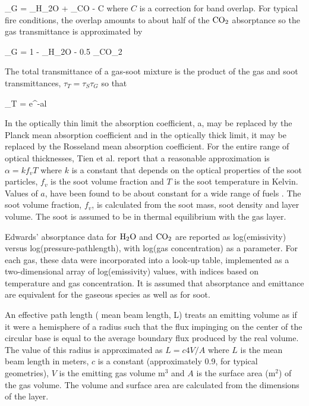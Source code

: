 \be \alpha_G = \alpha_{H_2O} + \alpha_{CO} - C\ee
where $C$ is a correction for band overlap.  For typical fire conditions, the overlap amounts to about half of the $\textnormal{CO}_2$ absorptance \cite{Tien:2002} so the gas transmittance is approximated by

\be \tau_G = 1 - \alpha_{H_2O} - 0.5 \alpha_{CO_2} \ee

The total transmittance of a gas-soot mixture is the product of the gas and soot transmittances, $\tau_T = \tau_S \tau_G$ so that

\be \tau_T = e^{-al}  \ee

In the optically thin limit the absorption coefficient, a, may be replaced by the Planck mean absorption coefficient and in the optically thick limit, it  may be replaced by the Rosseland mean absorption coefficient. For the entire range of optical thicknesses, Tien et al. \cite{Tien:2002} report that a reasonable approximation is $\alpha = k f_v T$ where $k$ is a constant that depends on the optical properties of the soot particles, $f_v$ is the soot volume fraction and $T$ is the soot temperature in Kelvin. Values of $a$, have been found to be about constant for a wide range of fuels \cite{Tien:1978}.   The soot volume fraction, $f_v$, is calculated from the soot mass, soot density and layer volume.  The soot is assumed to be in thermal equilibrium with the gas layer.

Edwards' absorptance data for $\textnormal{H}_2 \textnormal{O}$ and $\textnormal{CO}_2$ are reported \cite{Edwards:1985} as log(emissivity) versus log(pressure-pathlength), with  log(gas concentration) as a parameter. For each gas, these data were incorporated into a look-up table, implemented as a two-dimensional array of log(emissivity) values, with indices based on temperature and gas concentration.  It is assumed that absorptance and emittance are equivalent for the gaseous species as well as for soot.

An effective path length ( mean beam length, L) treats an emitting volume as if it were a hemisphere of a radius such that the flux impinging on the center of the circular base is equal to the average boundary flux produced by the real volume. The value of this radius is approximated as \cite{Tien:1978, Hottel:1942} $L = c 4 V / A$ where $L$ is the mean beam length in meters, $c$ is a constant (approximately 0.9, for typical geometries), $V$ is the emitting gas volume m$^3$ and $A$ is the surface area (m$^2$) of the gas volume. The volume and surface area are calculated from the dimensions of the layer.

